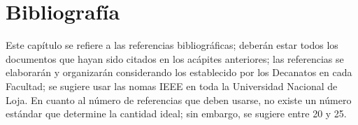 \clearpage

%
\clearpage
\section{Bibliografía}
\label{sec:bibliografia}
\vspace{-1.5 cm}
\printbibliography
Este capítulo se refiere a las referencias bibliográficas; deberán estar todos los documentos que hayan sido citados en los acápites anteriores; las referencias se elaborarán y organizarán considerando los establecido por los Decanatos en cada Facultad; se sugiere usar las nomas IEEE en toda la Universidad Nacional de Loja. En cuanto al número de referencias que deben usarse, no existe un número estándar que determine la cantidad ideal; sin embargo, se sugiere entre 20 y 25.